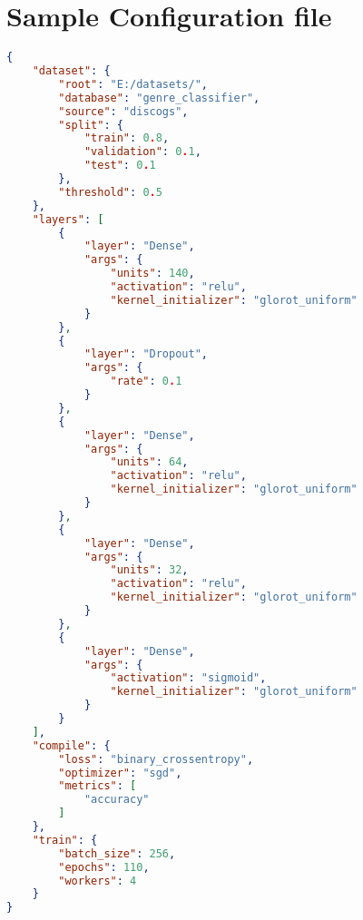 
\chapter{Sample Configuration file}

\label{AppendixH}

\begin{lstlisting}[language=json, caption=Sample Configuration file]
{
    "dataset": {
        "root": "E:/datasets/",
        "database": "genre_classifier",
        "source": "discogs",
        "split": {
            "train": 0.8,
            "validation": 0.1,
            "test": 0.1
        },
        "threshold": 0.5
    },
    "layers": [
        {
            "layer": "Dense",
            "args": {
                "units": 140,
                "activation": "relu",
                "kernel_initializer": "glorot_uniform"
            }
        },
        {
            "layer": "Dropout",
            "args": {
                "rate": 0.1
            }
        },
        {
            "layer": "Dense",
            "args": {
                "units": 64,
                "activation": "relu",
                "kernel_initializer": "glorot_uniform"
            }
        },
        {
            "layer": "Dense",
            "args": {
                "units": 32,
                "activation": "relu",
                "kernel_initializer": "glorot_uniform"
            }
        },
        {
            "layer": "Dense",
            "args": {
                "activation": "sigmoid",
                "kernel_initializer": "glorot_uniform"
            }
        }
    ],
    "compile": {
        "loss": "binary_crossentropy",
        "optimizer": "sgd",
        "metrics": [
            "accuracy"
        ]
    },
    "train": {
        "batch_size": 256,
        "epochs": 110,
        "workers": 4
    }
}
\end{lstlisting}

